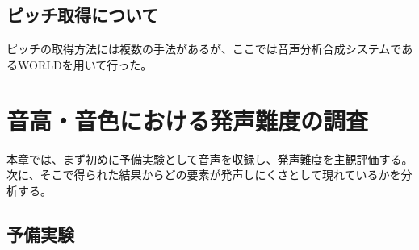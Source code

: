 \documentclass[10ptj,a4j,dvipdfmx,uplatex, draft]{jsbook}%
\begin{document}
\section{ピッチ取得について}
ピッチの取得方法には複数の手法があるが、ここでは音声分析合成システムであるWORLD\cite{world}を用いて行った。


\chapter{音高・音色における発声難度の調査}
本章では、まず初めに予備実験として音声を収録し、発声難度を主観評価する。
次に、そこで得られた結果からどの要素が発声しにくさとして現れているかを分析する。
\section{予備実験}
\end{document}
